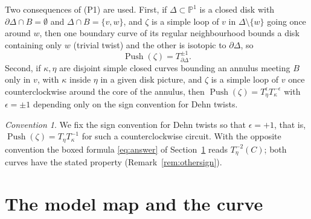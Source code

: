 \documentclass[11pt]{article}
\newcommand{\Pone}{\mathbb P^1}
\newcommand{\Push}{\operatorname{Push}}
\theoremstyle{remark}
\newtheorem{convention}[theorem]{Convention}
\numberwithin{equation}{section}
\begin{document}
Two consequences of (P1) are used. First, if $\Delta\subset\Pone$ is a
closed disk with $\partial\Delta\cap B=\emptyset$ and
$\Delta\cap B=\{v,w\}$, and $\zeta$ is a simple loop of $v$ in
$\Delta\setminus\{w\}$ going once around $w$, then one boundary curve of
its regular neighbourhood bounds a disk containing only $w$ (trivial
twist) and the other is isotopic to $\partial\Delta$, so
\begin{equation}\label{eq:twopunctures}
 \Push(\zeta)=T_{\partial\Delta}^{\pm1}.
\end{equation}
Second, if $\kappa,\eta$ are disjoint simple closed curves bounding an
annulus meeting $B$ only in $v$, with $\kappa$ inside $\eta$ in a given
disk picture,
 and $\zeta$ is a simple loop of $v$ once counterclockwise
around the core of the annulus, then
$\Push(\zeta)=T_\eta^{\epsilon}T_\kappa^{-\epsilon}$ with $\epsilon=\pm1$
depending only on the sign convention for Dehn twists.

\begin{convention}\label{conv:sign}
We fix the sign convention for Dehn twists so that $\epsilon=+1$, that is,
$\Push(\zeta)=T_\eta T_\kappa^{-1}$ for such a counterclockwise circuit.
With the opposite convention the boxed formula \eqref{eq:answer} of
Section~\ref{sec:curve} reads $T_\eta^{-2}(C)$; both curves have the
stated property (Remark~\ref{rem:othersign}).
\end{convention}

\section{The model map and the curve}\label{sec:curve}
\end{document}
